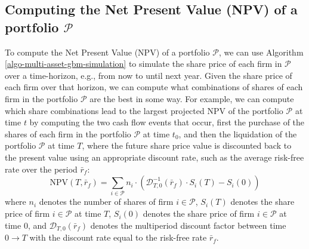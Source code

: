 \documentclass[11pt]{article}
\theoremstyle{definition}
\begin{document}
\subsection{Computing the Net Present Value (NPV) of a portfolio $\mathcal{P}$}
To compute the Net Present Value (NPV) of a portfolio $\mathcal{P}$, we can use Algorithm \ref{algo-multi-asset-gbm-simulation} to simulate the share price of each firm in $\mathcal{P}$ over a time-horizon, e.g., from now to until next year.
Given the share price of each firm over that horizon, we can compute what combinations of shares of each firm in the portfolio $\mathcal{P}$ are the best in some way. For example, we can compute which share combinations lead to the largest projected NPV of the portfolio $\mathcal{P}$ at time $t$ by computing the 
two cash flow events that occur, first the purchase of the shares of each firm in the portfolio $\mathcal{P}$ at time $t_{0}$, and then the liquidation of the portfolio $\mathcal{P}$ at time $T$, where the future share price value is discounted back to the present value using an appropriate discount rate, such as the average risk-free rate over the period $\bar{r}_{f}$:
\begin{equation}\label{eqn:npv-mv-gbm}
\text{NPV}(T,\bar{r}_{f}) = \sum_{i\in\mathcal{P}}n_{i}\cdot\left(\mathcal{D}_{T,0}^{-1}(\bar{r}_{f})\cdot{S_{i}(T)}-S_{i}(0)\right)
\end{equation}
where $n_{i}$ denotes the number of shares of firm $i\in\mathcal{P}$, $S_{i}(T)$ denotes the share price of firm $i\in\mathcal{P}$ at time $T$, $S_{i}(0)$ denotes the share price of firm $i\in\mathcal{P}$ at time $0$, and $\mathcal{D}_{T,0}(\bar{r}_{f})$ denotes the multiperiod discount factor between time $0\rightarrow{T}$ with the discount rate equal to the risk-free rate $\bar{r}_{f}$.
\end{document}

